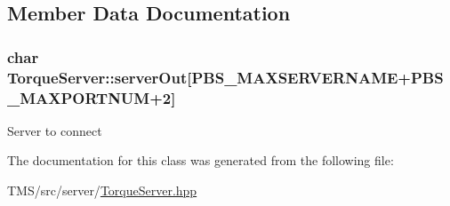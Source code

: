 \subsection{Member Data Documentation}
\hypertarget{classTorqueServer_ae798d6ea4f01fc4336756a0cba5a644c}{
\subsubsection[{serverOut}]{\setlength{\rightskip}{0pt plus 5cm}char {\bf TorqueServer::serverOut}\mbox{[}PBS\_\-MAXSERVERNAME+PBS\_\-MAXPORTNUM+2\mbox{]}}}
\label{classTorqueServer_ae798d6ea4f01fc4336756a0cba5a644c}
Server to connect 

The documentation for this class was generated from the following file:\begin{DoxyCompactItemize}
\item 
TMS/src/server/\hyperlink{TorqueServer_8hpp}{TorqueServer.hpp}\end{DoxyCompactItemize}
